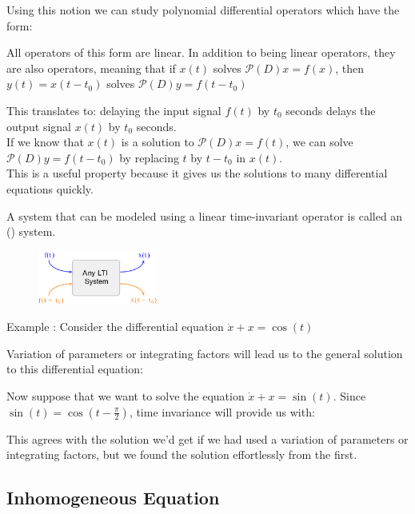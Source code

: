 \documentclass[11pt, openright]{book}
\begin{document}
\newpage

Using this notion we can study polynomial differential operators which have the form:

All operators of this form are linear. In addition to being linear operators, they are also  operators, meaning that if $x(t)$ solves $\mathcal{P}(D)x=f(x)$, then $y(t)=x(t-t_0)$ solves $\mathcal{P}(D)y=f(t-t_0)$

This translates to: delaying the input signal $f(t)$ by $t_0$ seconds delays the output signal $x(t)$ by $t_0$ seconds.\\
If we know that $x(t)$ is a solution to $\mathcal{P}(D)x=f(t)$, we can solve $\mathcal{P}(D)y=f(t-t_0)$ by replacing $t$ by $t-t_0$ in $x(t)$.\\ This is a useful property because it gives us the solutions to many differential equations quickly.

A system that can be modeled using a linear time-invariant operator is called an  () system.

\begin{figure}[ht]
    \centering
    \includegraphics[width=0.35\textwidth]{documents/l8/LTI.png}
\end{figure}

\begin{dent}{Example :}
    Consider the differential equation $\dot{x}+x=\cos(t)$

    Variation of parameters or integrating factors will lead us to the general solution to this differential equation:

    Now suppose that we want to solve the equation $\dot{x}+x=\sin(t)$. Since $\sin(t)=\cos(t-\frac{\pi}{2})$, time invariance will provide us with:

    This agrees with the solution we'd get if we had used a variation of parameters or integrating factors, but we found the solution effortlessly from the first.
\end{dent}

\subsection{Inhomogeneous Equation}
\end{document}
